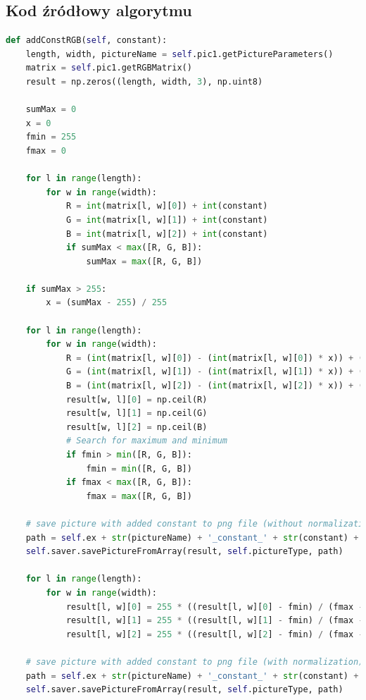 \documentclass[a4paper,12pt, titlepage]{report}
\begin{document}
\subsection*{Kod źródłowy algorytmu}
\begin{lstlisting}[language=Python]
def addConstRGB(self, constant):
    length, width, pictureName = self.pic1.getPictureParameters()
    matrix = self.pic1.getRGBMatrix()
    result = np.zeros((length, width, 3), np.uint8)

    sumMax = 0
    x = 0
    fmin = 255
    fmax = 0

    for l in range(length):
        for w in range(width):
            R = int(matrix[l, w][0]) + int(constant)
            G = int(matrix[l, w][1]) + int(constant)
            B = int(matrix[l, w][2]) + int(constant)
            if sumMax < max([R, G, B]):
                sumMax = max([R, G, B])

    if sumMax > 255:
        x = (sumMax - 255) / 255

    for l in range(length):
        for w in range(width):
            R = (int(matrix[l, w][0]) - (int(matrix[l, w][0]) * x)) + (int(constant) - (int(constant) * x))
            G = (int(matrix[l, w][1]) - (int(matrix[l, w][1]) * x)) + (int(constant) - (int(constant) * x))
            B = (int(matrix[l, w][2]) - (int(matrix[l, w][2]) * x)) + (int(constant) - (int(constant) * x))
            result[w, l][0] = np.ceil(R)
            result[w, l][1] = np.ceil(G)
            result[w, l][2] = np.ceil(B)
            # Search for maximum and minimum
            if fmin > min([R, G, B]):
                fmin = min([R, G, B])
            if fmax < max([R, G, B]):
                fmax = max([R, G, B])

    # save picture with added constant to png file (without normalization)
    path = self.ex + str(pictureName) + '_constant_' + str(constant) + '.png'
    self.saver.savePictureFromArray(result, self.pictureType, path)

    for l in range(length):
        for w in range(width):
            result[l, w][0] = 255 * ((result[l, w][0] - fmin) / (fmax - fmin))
            result[l, w][1] = 255 * ((result[l, w][1] - fmin) / (fmax - fmin))
            result[l, w][2] = 255 * ((result[l, w][2] - fmin) / (fmax - fmin))

    # save picture with added constant to png file (with normalization)
    path = self.ex + str(pictureName) + '_constant_' + str(constant) + '_normalized.png'
    self.saver.savePictureFromArray(result, self.pictureType, path)
\end{lstlisting}
\end{document}
